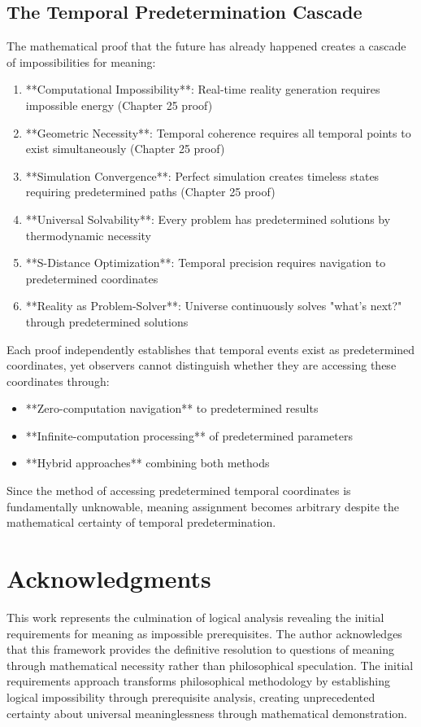 \documentclass[12pt,a4paper]{article}
\begin{document}
\subsection{The Temporal Predetermination Cascade}

The mathematical proof that the future has already happened creates a cascade of impossibilities for meaning:

\begin{enumerate}
\item **Computational Impossibility**: Real-time reality generation requires impossible energy (Chapter 25 proof)
\item **Geometric Necessity**: Temporal coherence requires all temporal points to exist simultaneously (Chapter 25 proof)  
\item **Simulation Convergence**: Perfect simulation creates timeless states requiring predetermined paths (Chapter 25 proof)
\item **Universal Solvability**: Every problem has predetermined solutions by thermodynamic necessity
\item **S-Distance Optimization**: Temporal precision requires navigation to predetermined coordinates
\item **Reality as Problem-Solver**: Universe continuously solves "what's next?" through predetermined solutions
\end{enumerate}

Each proof independently establishes that temporal events exist as predetermined coordinates, yet observers cannot distinguish whether they are accessing these coordinates through:

\begin{itemize}
\item **Zero-computation navigation** to predetermined results
\item **Infinite-computation processing** of predetermined parameters  
\item **Hybrid approaches** combining both methods
\end{itemize}

Since the method of accessing predetermined temporal coordinates is fundamentally unknowable, meaning assignment becomes arbitrary despite the mathematical certainty of temporal predetermination.

\section*{Acknowledgments}

This work represents the culmination of logical analysis revealing the initial requirements for meaning as impossible prerequisites. The author acknowledges that this framework provides the definitive resolution to questions of meaning through mathematical necessity rather than philosophical speculation. The initial requirements approach transforms philosophical methodology by establishing logical impossibility through prerequisite analysis, creating unprecedented certainty about universal meaninglessness through mathematical demonstration.


\end{document}
